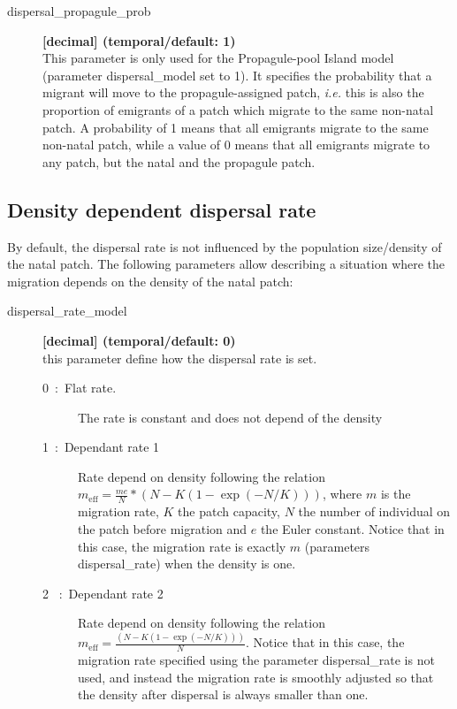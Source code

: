 \documentclass[letterpaper,12pt,oneside]{book}
\begin{document}
\begin{description}
\item[dispersal\_propagule\_prob] \textbf{[decimal] (temporal/default: 1)}\\
This parameter is only used for the Propagule-pool Island model (parameter \textsf{dispersal\_model} set to 1). It specifies the probability that a migrant will move to the propagule-assigned patch, \textit{i.e.} this is also the proportion of emigrants of a patch which migrate to the same non-natal patch. A probability of 1 means that all emigrants migrate to the same non-natal patch, while a value of 0 means that all emigrants migrate to any patch, but the natal and the propagule patch. 

\end{description}

\subsection{Density dependent dispersal rate}
By default, the dispersal rate is not influenced by the population size/density of the natal patch. The following parameters allow describing a situation where the migration depends on the density of the natal patch: 

 \begin{description}
\item[dispersal\_rate\_model] \textbf{[decimal] (temporal/default: 0)}\\
this parameter define how the dispersal rate is set.
\begin{description}
                  \item[0~:~Flat rate.] The rate is constant and does not depend of the density
                  \item [1~:~Dependant rate 1] Rate depend on density following the relation $ m_{\text{eff}} = \frac{me}{N}*(N-K(1-\exp(-N/K)))$, where $m$ is the migration rate, $K$ the patch capacity, $N$ the number of individual on the patch before migration and $e$ the Euler constant. Notice that in this case, the migration rate is exactly $m$ (parameters \textsf{dispersal\_rate}) when the density is one.
                   \item [2 ~:~Dependant rate 2] Rate depend on density following the relation $m_{\text{eff}} =\frac{(N-K(1-\exp(-N/K)))}{N}$. Notice that in this case, the migration rate specified using the parameter \textsf{dispersal\_rate} is not used, and instead the migration rate is smoothly adjusted so that the density after dispersal is always smaller than one. 
\end{description}
\end{description}
\end{document}

